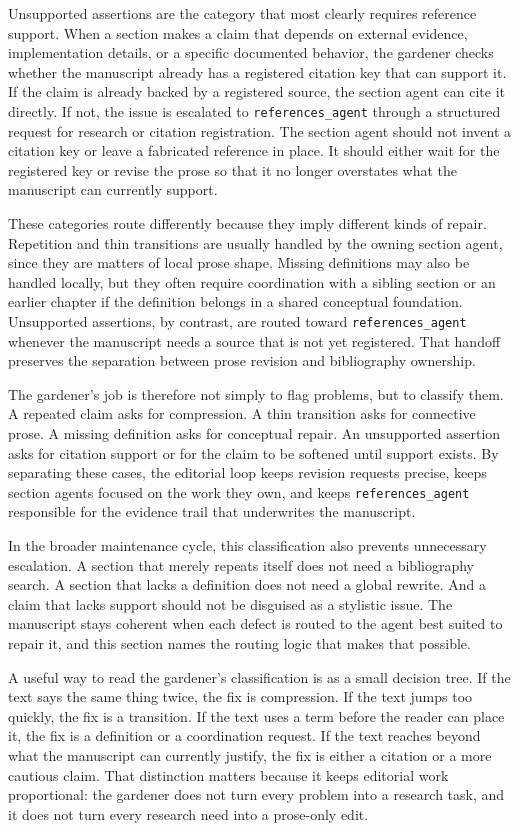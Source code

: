 \documentclass[11pt]{article}
\begin{document}
Unsupported assertions are the category that most clearly requires reference support. When a section makes a claim that depends on external evidence, implementation details, or a specific documented behavior, the gardener checks whether the manuscript already has a registered citation key that can support it. If the claim is already backed by a registered source, the section agent can cite it directly. If not, the issue is escalated to \texttt{references\_agent} through a structured request for research or citation registration. The section agent should not invent a citation key or leave a fabricated reference in place. It should either wait for the registered key or revise the prose so that it no longer overstates what the manuscript can currently support.

These categories route differently because they imply different kinds of repair. Repetition and thin transitions are usually handled by the owning section agent, since they are matters of local prose shape. Missing definitions may also be handled locally, but they often require coordination with a sibling section or an earlier chapter if the definition belongs in a shared conceptual foundation. Unsupported assertions, by contrast, are routed toward \texttt{references\_agent} whenever the manuscript needs a source that is not yet registered. That handoff preserves the separation between prose revision and bibliography ownership.

The gardener's job is therefore not simply to flag problems, but to classify them. A repeated claim asks for compression. A thin transition asks for connective prose. A missing definition asks for conceptual repair. An unsupported assertion asks for citation support or for the claim to be softened until support exists. By separating these cases, the editorial loop keeps revision requests precise, keeps section agents focused on the work they own, and keeps \texttt{references\_agent} responsible for the evidence trail that underwrites the manuscript.

In the broader maintenance cycle, this classification also prevents unnecessary escalation. A section that merely repeats itself does not need a bibliography search. A section that lacks a definition does not need a global rewrite. And a claim that lacks support should not be disguised as a stylistic issue. The manuscript stays coherent when each defect is routed to the agent best suited to repair it, and this section names the routing logic that makes that possible.

A useful way to read the gardener's classification is as a small decision tree. If the text says the same thing twice, the fix is compression. If the text jumps too quickly, the fix is a transition. If the text uses a term before the reader can place it, the fix is a definition or a coordination request. If the text reaches beyond what the manuscript can currently justify, the fix is either a citation or a more cautious claim. That distinction matters because it keeps editorial work proportional: the gardener does not turn every problem into a research task, and it does not turn every research need into a prose-only edit.
\end{document}
